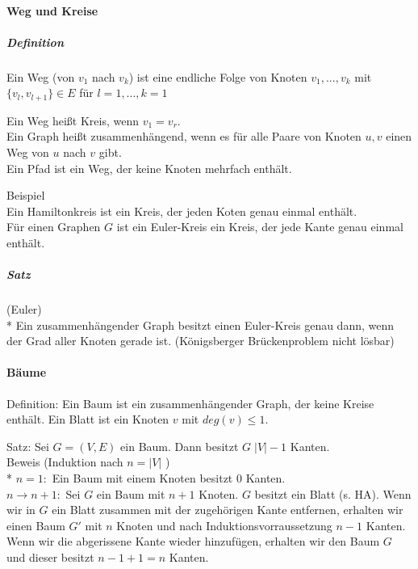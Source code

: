 \documentclass[a4paper]{scrartcl}
\begin{document}
\paragraph{Weg und Kreise}
\subparagraph{Definition}
Ein Weg (von $v_1$ nach $v_k$) ist eine endliche Folge von Knoten $v_1,...,v_k$ mit $\{v_l,v_{l+1}\} \in E$ für $l=1,...,k=1$


Ein Weg heißt Kreis, wenn $v_1 = v_r$.\\
Ein Graph heißt zusammenhängend, wenn es für alle Paare von Knoten $u,v$ einen Weg von $u$ nach $v$ gibt.\\
Ein Pfad ist ein Weg, der keine Knoten mehrfach enthält.

Beispiel\\
Ein Hamiltonkreis ist ein Kreis, der jeden Koten genau einmal enthält.\\
Für einen Graphen $G$ ist ein Euler-Kreis ein Kreis, der jede Kante genau einmal enthält.
\subparagraph{Satz} (Euler)\\*
Ein zusammenhängender Graph besitzt einen Euler-Kreis genau dann, wenn der Grad aller Knoten gerade ist.
(Königsberger Brückenproblem nicht lösbar)

\paragraph{Bäume}
Definition: Ein Baum ist ein zusammenhängender Graph, der keine Kreise enthält. Ein Blatt ist ein Knoten $v$ mit $deg(v)\leq 1$.

Satz: Sei $G=(V,E)$ ein Baum. Dann besitzt $G \; \lvert V \rvert -1$ Kanten.\\
Beweis (Induktion nach $n=\lvert V \rvert$ )\\*
$n=1:$ Ein Baum mit einem Knoten besitzt 0 Kanten.\\
$n \rightarrow n+1:$ Sei $G$ ein Baum mit $n+1$ Knoten. $G$ besitzt ein Blatt (s. HA). Wenn wir in $G$ ein Blatt zusammen mit der zugehörigen Kante entfernen, erhalten wir einen Baum $G'$ mit $n$ Knoten und nach Induktionsvorraussetzung $n-1$ Kanten. Wenn wir die abgerissene Kante wieder hinzufügen, erhalten wir den Baum $G$ und dieser besitzt $n-1 +1 = n$ Kanten.
\end{document}
